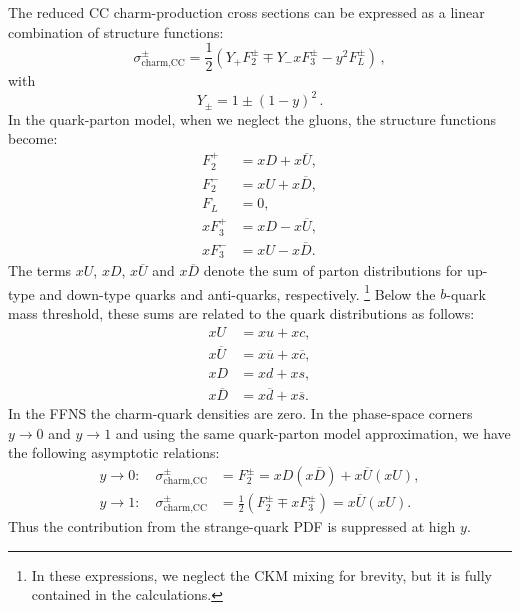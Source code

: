 \documentclass[pdftex,twocolumn,epjc3]{svjour3}          %
\begin{document}
The reduced CC charm-production cross sections can be expressed as a
linear combination of structure functions:
\begin{equation}
  \sigma^{\pm}_{\text{charm,CC}} = \frac12\left(Y_{+}F_2^{\pm} \mp
    Y_{-}xF_3^{\pm} - y^2F_L^{\pm}\right)\,,
\end{equation}
with 
\begin{equation}
  Y_{\pm} = 1 \pm (1-y)^2 \,.
\end{equation}
In the quark-parton model,
%
%
when we neglect the gluons, the structure
functions become:
\begin{equation}
\begin{split}
    F_2^{+} &= xD + x\overline{U}, \\
    F_2^{-} &= xU + x\overline{D},\\
    F_L &= 0,\\
    xF_3^{+} &= xD - x\overline{U}, \\
    xF_3^{-} &= xU - x\overline{D}.
\end{split}
\end{equation}
The terms $xU$, $xD$, $x\overline{U}$ and $x\overline{D}$ denote the
sum of parton distributions for up-type and down-type quarks and
anti-quarks, respectively.%
\footnote{In these expressions, we neglect the CKM mixing for brevity, but it is fully contained in the calculations.} 
Below the $b$-quark mass threshold, these
sums are related to the quark distributions as follows:
\begin{equation}
\begin{split}
 xU &= xu + xc , \\
 x\overline{U} &= x\overline{u} + x\overline{c} , \\
 xD &= xd + xs , \\
 x\overline{D} &= x\overline{d} + x\overline{s}.
\end{split}
\end{equation}
In the FFNS the charm-quark densities are zero. In the phase-space
corners $y \to 0$ and $y \to 1$ and using the same quark-parton model approximation, we have the following asymptotic
relations:
\begin{equation}
\begin{split}
 y \to 0: \quad \sigma^{\pm}_{\text{charm,CC}} &= F_2^{\pm} = xD(x\overline{D}) + x\overline{U}(xU), \\[10pt]
 y \to 1: \quad \sigma^{\pm}_{\text{charm,CC}} &= \frac12(F_2^{\pm} \mp xF_3^{\pm}) = x\overline{U} (xU).
\label{eq:y01}
\end{split}
\end{equation}
Thus the contribution from the strange-quark PDF is suppressed at high $y$.
\end{document}
